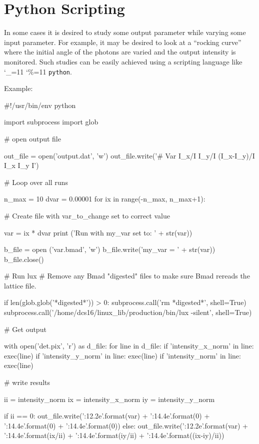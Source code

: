 \documentclass[11pt]{article}
\newcommand\ttcmd{\begingroup\catcode`\_=11 \catcode`\%=11 \dottcmd}
\newcommand\dottcmd[1]{\texttt{#1}\endgroup}
\newcommand{\vn}{\ttcmd}
\begin{document}
{{{{{{{{{{{{{{{%
\section{Python Scripting}
\label{s:python}

In some cases it is desired to study some output parameter while varying some input parameter. For
example, it may be desired to look at a ``rocking curve'' where the initial angle of the photons are
varied and the output intensity is monitored.  Such studies can be easily achieved using a scripting
language like \vn{python}.

Example:
\begin{listing}{1}
#!/usr/bin/env python

import subprocess
import glob

# open output file

out_file = open('output.dat', 'w')
out_file.write('#       Var         I_x/I         I_y/I   (I_x-I_y)/I           I_x           I_y             I\n')

# Loop over all runs

n_max = 10
dvar = 0.00001
for ix in range(-n_max, n_max+1):

  # Create file with var_to_change set to correct value

  var = ix * dvar
  print ('Run with my_var set to: ' + str(var))

  b_file = open ('var.bmad', 'w')
  b_file.write('my_var = ' + str(var))
  b_file.close()

  # Run lux
  # Remove any Bmad "digested" files to make sure Bmad rereads the lattice file.

  if len(glob.glob('*digested*')) > 0: subprocess.call('rm *digested*', shell=True)
  subprocess.call('/home/dcs16/linux_lib/production/bin/lux -silent', shell=True)

  # Get output

  with open('det.pix', 'r') as d_file:
    for line in d_file:
      if 'intensity_x_norm' in line: exec(line)
      if 'intensity_y_norm' in line: exec(line)
      if 'intensity_norm' in line: exec(line)

  # write results

  ii = intensity_norm
  ix = intensity_x_norm
  iy = intensity_y_norm

  if ii == 0:
    out_file.write('{:12.2e}'.format(var) + '{:14.4e}'.format(0) + 
                   '{:14.4e}'.format(0) + '{:14.4e}'.format(0))
  else:
    out_file.write('{:12.2e}'.format(var) + '{:14.4e}'.format(ix/ii) + 
                   '{:14.4e}'.format(iy/ii) + '{:14.4e}'.format((ix-iy)/ii))


\end{listing}}}}}}}}}}}}}}}}
\end{document}
